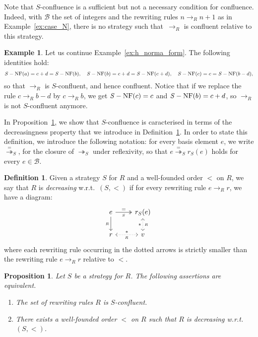 \documentclass[10pt]{easychair}
\newtheorem{proposition}[theorem]{Proposition}
\theoremstyle{definition}
\newtheorem{definition}[theorem]{Definition}
\newtheorem{example}[theorem]{Example}
\newcommand\basis{\mathscr{B}}
\newcommand\rewR{\to_R}
\newcommand\rewS{\twoheadrightarrow_S}
\DeclareMathOperator{\SNF}{{\it S}-NF}
\begin{document}
Note that $S$-confluence is a sufficient but not a necessary condition for
confluence. Indeed, with $\basis$ the set of integers and the rewriting rules
$n\rewR n+1$ as in Example~\ref{ex:case_N}, there is no strategy such
that~$\rewR$ is confluent relative to this strategy.  \smallskip

\begin{example}\label{ex:S-conf}
  Let us continue Example~\ref{ex:h_norma_form}. The following identities
  hold:
  \[\SNF(a)=c+d=\SNF(b),\quad\SNF(b)=c+d=\SNF(c+d),\quad\SNF(c)=c=
  \SNF(b-d),
  \smallskip\]
  so that $\rewR$ is $S$-confluent, and hence confluent. Notice that if
  we replace the rule $c\rewR b-d$ by $c\rewR b$, we get $\SNF(c)=c$ and
  $\SNF(b)=c+d$, so $\rewR$ is not $S$-confluent anymore. 
\end{example}
\smallskip

In Proposition~\ref{prop:S-conf_decreasing}, we show that $S$-confluence
is caracterised in terms of the decreasingness property that we introduce
in Definition~\ref{def:decreasing}. In order to state this definition, we
introduce the following notation: for every basis element $e$, we write
$\overset{=}{\twoheadrightarrow}_S$, for the closure of $\rewS$ under
reflexivity, so that $e\overset{=}{\twoheadrightarrow}_Sr_S(e)$ holds for
every $e\in\basis$.
\smallskip

\begin{definition}\label{def:decreasing}
  Given a strategy $S$ for $R$ and a well-founded order $<$ on $R$,
  we say that $R$ is {\em decreasing} w.r.t.\ $(S,<)$ if for every
  rewriting rule $e\rewR r$, we have a diagram:
  \[\begin{tikzcd}
      e\ar[d, "_R"']\ar[r, twoheadrightarrow, "=", "_S"'] &
      r_S(e)\ar[d, leftrightarrow, dotted, "*"', "_R"]\\
      r\ar[r, leftrightarrow, dotted, "*", "_R"'] & v
    \end{tikzcd}\]
  where each rewriting rule occurring in the dotted arrows is strictly
  smaller than the rewriting rule $e\rewR r$ relative to $<$.
\end{definition}
\smallskip

\begin{proposition}\label{prop:S-conf_decreasing}
  Let $S$ be a strategy for $R$. The following assertions are equivalent.
  \begin{enumerate}
  \item The set of rewriting rules $R$ is $S$-confluent.
  \item There exists a well-founded order $<$ on $R$ such that $R$ is
    decreasing w.r.t.\ $(S,<)$.
  \end{enumerate}
\end{proposition}
\end{document}
